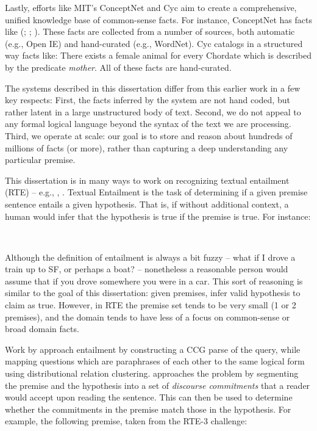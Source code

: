 Lastly, efforts like MIT's ConceptNet \cite{key:2011tandon-conceptnet} and Cyc \cite{key:1995lenat-cyc}
  aim to create a comprehensive, unified knowledge base of common-sense facts.
For instance, ConceptNet has facts like (; ; ).
These facts are collected from a number of sources, both automatic (e.g., Open IE) and hand-curated
  (e.g., WordNet).
Cyc catalogs in a structured way facts like: There exists a female animal for every Chordate
  which is described by the predicate \textit{mother}.
All of these facts are hand-curated.

The systems described in this dissertation differ from this earlier work in a few key respects:
First, the facts inferred by the system are not hand coded, but rather latent in a large
  unstructured body of text.
Second, we do not appeal to any formal logical language beyond the syntax of the text we are processing.
Third, we operate at scale: our goal is to store and reason about hundreds of millions of facts (or more),
  rather than capturing a deep understanding any particular premise.


%
%

This dissertation is in many ways to work on 
  recognizing textual entailment (RTE) -- e.g., 
  , .
Textual Entailment is the task of determining if a given premise sentence
  entails a given hypothesis.
That is, if without additional context, a human would infer that the hypothesis
  is true if the premise is true.
For instance:

\begin{displayquote}
   \\
\end{displayquote}

Although the definition of entailment is always a bit fuzzy -- what if I drove a train
  up to SF, or perhaps a boat? -- nonetheless a reasonable person would assume that if
  you drove somewhere you were in a car.
This sort of reasoning is similar to the goal of this dissertation: given premises, infer
  valid hypothesis to claim as true.
However, in RTE the premise set tends to be very small (1 or 2 premises), and the domain
  tends to have less of a focus on common-sense or broad domain facts.


Work by 
  approach entailment by constructing a CCG parse of the query,
  while mapping questions which are paraphrases of each other to the
  same logical form using distributional relation clustering.
 approaches the problem by segmenting the premise and
  the hypothesis into a set of \textit{discourse commitments} that a reader would
  accept upon reading the sentence.
This can then be used to determine whether the commitments in the premise match those in
  the hypothesis.
For example, the following premise, taken from the RTE-3 challenge:

